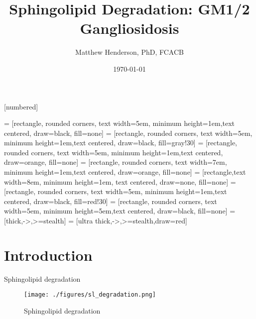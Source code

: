 \documentclass[presentation, smaller]{beamer}
\author{Matthew Henderson, PhD, FCACB}
\date{\today}
\title{Sphingolipid Degradation: GM1/2 Gangliosidosis}
\institute[NSO]{Newborn Screening Ontario | The University of Ottawa}
\begin{document}
\maketitle

\vspace{220pt}
\beamertemplatenavigationsymbolsempty
{}[numbered]

 = [rectangle, rounded corners, text width=5em, minimum height=1em,text centered, draw=black, fill=none]
 = [rectangle, rounded corners, text width=5em, minimum height=1em,text centered, draw=black, fill=gray!30]
 = [rectangle, rounded corners, text width=5em, minimum height=1em,text centered, draw=orange, fill=none]
 = [rectangle, rounded corners, text width=7em, minimum height=1em,text centered, draw=orange, fill=none]
 = [rectangle,text width=8em, minimum height=1em, text centered, draw=none, fill=none]
 = [rectangle, rounded corners, text width=5em, minimum height=1em,text centered, draw=black, fill=red!30]
 = [rectangle, rounded corners, text width=5em, minimum height=5em,text centered, draw=black, fill=none]
 = [thick,->,>=stealth]
 = [ultra thick,->,>=stealth,draw=red]

\section{Introduction}
\label{sec:orgheadline12}

\begin{frame}[label={sec:orgheadline1}]{Sphingolipid degradation}
\begin{figure}[htb]
\centering
\texttt{[image: ./figures/sl\_degradation.png]}
\caption[deg]{\label{fig:sld}
Sphingolipid degradation}
\end{figure}
\end{frame}
\end{document}
